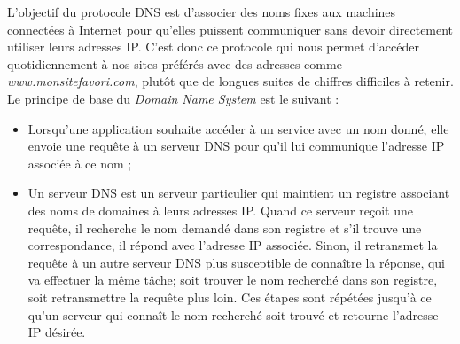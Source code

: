 \documentclass[11pt, a4paper]{book}
\begin{document}
L'objectif du protocole DNS est d'associer des noms fixes aux machines connectées à Internet pour qu'elles puissent communiquer sans devoir directement utiliser leurs adresses IP. C'est donc ce protocole qui nous permet d'accéder quotidiennement à nos sites préférés avec des adresses comme {\it www.monsitefavori.com}, plutôt que de longues suites de chiffres difficiles à retenir.
Le principe de base du {\it Domain Name System} est le suivant :
\begin{itemize}
\item Lorsqu'une application souhaite accéder à un service avec un nom donné, elle envoie une
requête à un serveur DNS pour qu'il lui communique l'adresse IP associée à ce nom ;
\item Un serveur DNS est un serveur particulier qui maintient un registre associant des noms de domaines à leurs adresses IP. Quand ce serveur reçoit une requête, il recherche le nom demandé dans son registre et s'il trouve une correspondance, il répond avec l'adresse IP associée. Sinon, il retransmet la requête à un autre serveur DNS plus susceptible de connaître
la réponse, qui va effectuer la même tâche; soit trouver le nom recherché dans son registre, soit retransmettre la requête plus loin. Ces étapes sont répétées jusqu'à ce qu'un serveur qui connaît le nom recherché soit trouvé et retourne l'adresse IP désirée.
\end{itemize}
\end{document}
